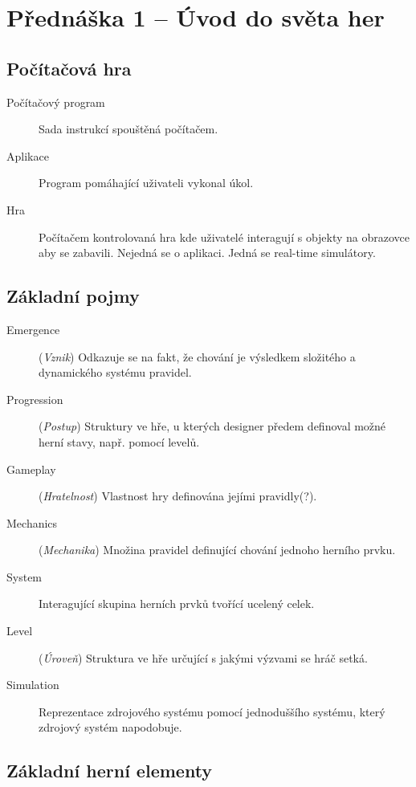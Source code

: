 \section{Přednáška 1 -- Úvod do světa her}

\subsection*{Počítačová hra}

\medskip

\begin{description}
    \item[Počítačový program] Sada instrukcí spouštěná počítačem.
    \item[Aplikace] Program pomáhající uživateli vykonal úkol.
    \item[Hra] Počítačem kontrolovaná hra kde uživatelé interagují s objekty na obrazovce aby se zabavili. Nejedná se o aplikaci. Jedná se real-time simulátory.
\end{description}

\subsection*{Základní pojmy}

\medskip

\begin{description}
    \item[Emergence] (\textit{Vznik}) Odkazuje se na fakt, že chování je výsledkem složitého a dynamického systému pravidel.
    \item[Progression] (\textit{Postup}) Struktury ve hře, u kterých designer předem definoval možné herní stavy, např. pomocí levelů.
    \item[Gameplay] (\textit{Hratelnost}) Vlastnost hry definována jejími pravidly(?).
    \item[Mechanics] (\textit{Mechanika}) Množina pravidel definující chování jednoho herního prvku.
    \item[System] Interagující skupina herních prvků tvořící ucelený celek.
    \item[Level] (\textit{Úroveň}) Struktura ve hře určující s jakými výzvami se hráč setká.
    \item[Simulation] Reprezentace zdrojového systému pomocí jednoduššího systému, který zdrojový systém napodobuje.
\end{description}

\subsection*{Základní herní elementy}

